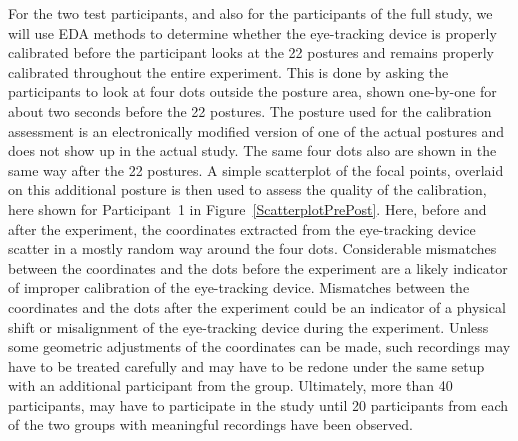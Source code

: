 \documentclass[11pt]{asaproc}
\begin{document}
For the two test participants, and also for the participants of the full study, we will use EDA methods
to determine whether the eye-tracking device is properly calibrated before the participant looks
at the 22 postures and remains properly calibrated throughout the entire experiment. This is
done by asking the participants to look at four dots outside the posture area, shown one-by-one
for about two seconds before the 22 postures. 
The posture used for the calibration assessment is an electronically modified version
of one of the actual postures and does not show up in the actual study.
The same four dots also are shown in the same
way after the 22 postures. A simple scatterplot of the focal points, overlaid on this additional posture is then used
to assess the quality of the calibration, here shown for Participant~1 in Figure~\ref{ScatterplotPrePost}.
Here, before and after the experiment, the coordinates extracted from the eye-tracking device
scatter in a mostly random way around the four dots. Considerable mismatches between the
coordinates and the dots before the experiment are a likely indicator of improper calibration
of the eye-tracking device. Mismatches  between the
coordinates and the dots after the experiment could be an indicator of a physical shift or misalignment
of the eye-tracking device during the experiment. Unless some geometric adjustments of the
coordinates can be made, such recordings may have to be treated carefully and may have to
be redone under the same setup with an additional participant from the group.
Ultimately, more than 40 participants, may have to participate in the study until 20 participants from each of the two groups
with meaningful recordings have been observed.
\end{document}

